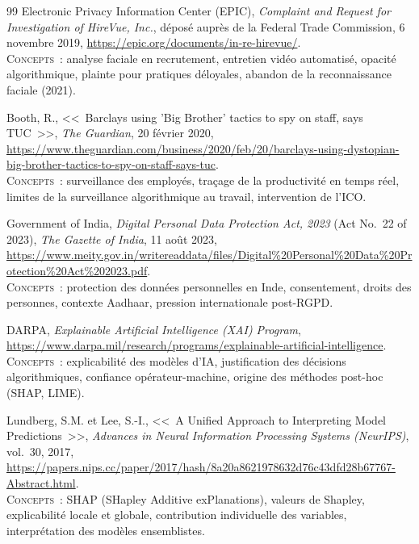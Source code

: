 \documentclass[12pt,a4paper]{article}
\begin{document}
\begin{thebibliography}{99}
Electronic Privacy Information Center (EPIC), \textit{Complaint and Request for Investigation of HireVue, Inc.}, déposé auprès de la Federal Trade Commission, 6 novembre 2019,
\url{https://epic.org/documents/in-re-hirevue/}.
\\[2pt] {\small \textsc{Concepts~:} analyse faciale en recrutement, entretien vidéo automatisé, opacité algorithmique, plainte pour pratiques déloyales, abandon de la reconnaissance faciale (2021).}

Booth, R., <<~Barclays using 'Big Brother' tactics to spy on staff, says TUC~>>, \textit{The Guardian}, 20 février 2020,
\url{https://www.theguardian.com/business/2020/feb/20/barclays-using-dystopian-big-brother-tactics-to-spy-on-staff-says-tuc}.
\\[2pt] {\small \textsc{Concepts~:} surveillance des employés, traçage de la productivité en temps réel, limites de la surveillance algorithmique au travail, intervention de l'ICO.}


Government of India, \textit{Digital Personal Data Protection Act, 2023} (Act No.~22 of 2023), \textit{The Gazette of India}, 11 août 2023,
\url{https://www.meity.gov.in/writereaddata/files/Digital\%20Personal\%20Data\%20Protection\%20Act\%202023.pdf}.
\\[2pt] {\small \textsc{Concepts~:} protection des données personnelles en Inde, consentement, droits des personnes, contexte Aadhaar, pression internationale post-RGPD.}


DARPA, \textit{Explainable Artificial Intelligence (XAI) Program},
\url{https://www.darpa.mil/research/programs/explainable-artificial-intelligence}.
\\[2pt] {\small \textsc{Concepts~:} explicabilité des modèles d'IA, justification des décisions algorithmiques, confiance opérateur-machine, origine des méthodes post-hoc (SHAP, LIME).}

Lundberg, S.M. et Lee, S.-I., <<~A Unified Approach to Interpreting Model Predictions~>>, \textit{Advances in Neural Information Processing Systems (NeurIPS)}, vol.~30, 2017,
\url{https://papers.nips.cc/paper/2017/hash/8a20a8621978632d76c43dfd28b67767-Abstract.html}.
\\[2pt] {\small \textsc{Concepts~:} SHAP (SHapley Additive exPlanations), valeurs de Shapley, explicabilité locale et globale, contribution individuelle des variables, interprétation des modèles ensemblistes.}


\end{thebibliography}
\end{document}
